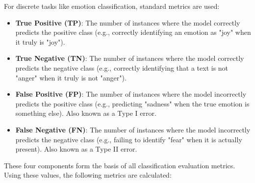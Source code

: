 For discrete tasks like emotion classification, standard metrics are used:
\begin{itemize}
    \item \textbf{True Positive (TP)}: The number of instances where the model correctly predicts the positive class (e.g., correctly identifying an emotion as "joy" when it truly is "joy").
    
    \item \textbf{True Negative (TN)}: The number of instances where the model correctly predicts the negative class (e.g., correctly identifying that a text is not "anger" when it truly is not "anger").
    
    \item \textbf{False Positive (FP)}: The number of instances where the model incorrectly predicts the positive class (e.g., predicting "sadness" when the true emotion is something else). Also known as a Type I error.
    
    \item \textbf{False Negative (FN)}: The number of instances where the model incorrectly predicts the negative class (e.g., failing to identify "fear" when it is actually present). Also known as a Type II error.
\end{itemize}

These four components form the basis of all classification evaluation metrics. Using these values, the following metrics are calculated:

